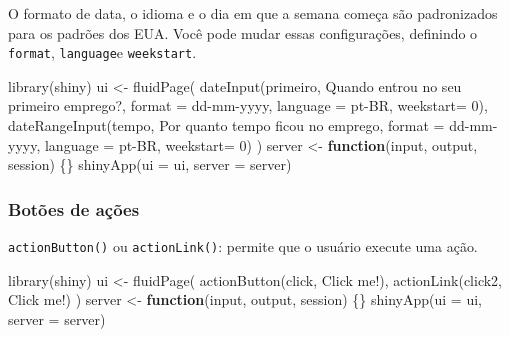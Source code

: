 \documentclass[
]{book}
\newenvironment{Shaded}{\begin{snugshade}}{\end{snugshade}}
\newcommand{\AttributeTok}[1]{\textcolor[rgb]{0.77,0.63,0.00}{#1}}
\newcommand{\ControlFlowTok}[1]{\textcolor[rgb]{0.13,0.29,0.53}{\textbf{#1}}}
\newcommand{\DecValTok}[1]{\textcolor[rgb]{0.00,0.00,0.81}{#1}}
\newcommand{\FunctionTok}[1]{\textcolor[rgb]{0.00,0.00,0.00}{#1}}
\newcommand{\NormalTok}[1]{#1}
\newcommand{\OtherTok}[1]{\textcolor[rgb]{0.56,0.35,0.01}{#1}}
\newcommand{\StringTok}[1]{\textcolor[rgb]{0.31,0.60,0.02}{#1}}
\begin{document}
O formato de data, o idioma e o dia em que a semana começa são padronizados para os padrões dos EUA.
Você pode mudar essas configurações, definindo o \texttt{format}, \texttt{language}e \texttt{weekstart}.

\begin{Shaded}
\begin{Highlighting}[]
\FunctionTok{library}\NormalTok{(shiny)}
\NormalTok{ui }\OtherTok{\textless{}{-}} \FunctionTok{fluidPage}\NormalTok{(}
  \FunctionTok{dateInput}\NormalTok{(}\StringTok{\textquotesingle{}primeiro\textquotesingle{}}\NormalTok{, }\StringTok{\textquotesingle{}Quando entrou no seu primeiro emprego?\textquotesingle{}}\NormalTok{, }\AttributeTok{format =} \StringTok{\textquotesingle{}dd{-}mm{-}yyyy\textquotesingle{}}\NormalTok{, }\AttributeTok{language =} \StringTok{\textquotesingle{}pt{-}BR\textquotesingle{}}\NormalTok{, }\AttributeTok{weekstart=} \DecValTok{0}\NormalTok{),}
  \FunctionTok{dateRangeInput}\NormalTok{(}\StringTok{\textquotesingle{}tempo\textquotesingle{}}\NormalTok{, }\StringTok{\textquotesingle{}Por quanto tempo ficou no emprego\textquotesingle{}}\NormalTok{, }\AttributeTok{format =} \StringTok{\textquotesingle{}dd{-}mm{-}yyyy\textquotesingle{}}\NormalTok{, }\AttributeTok{language =} \StringTok{\textquotesingle{}pt{-}BR\textquotesingle{}}\NormalTok{, }\AttributeTok{weekstart=} \DecValTok{0}\NormalTok{)}
\NormalTok{)}
\NormalTok{server }\OtherTok{\textless{}{-}} \ControlFlowTok{function}\NormalTok{(input, output, session) \{\}}
\FunctionTok{shinyApp}\NormalTok{(}\AttributeTok{ui =}\NormalTok{ ui, }\AttributeTok{server =}\NormalTok{ server)}
\end{Highlighting}
\end{Shaded}

\hypertarget{botuxf5es-de-auxe7uxf5es}{%
\subsubsection{\texorpdfstring{\textbf{Botões de ações}}{Botões de ações}}\label{botuxf5es-de-auxe7uxf5es}}

\texttt{actionButton()} ou \texttt{actionLink()}: permite que o usuário execute uma ação.

\begin{Shaded}
\begin{Highlighting}[]
\FunctionTok{library}\NormalTok{(shiny)}
\NormalTok{ui }\OtherTok{\textless{}{-}} \FunctionTok{fluidPage}\NormalTok{(}
  \FunctionTok{actionButton}\NormalTok{(}\StringTok{\textquotesingle{}click\textquotesingle{}}\NormalTok{, }\StringTok{\textquotesingle{}Click me!\textquotesingle{}}\NormalTok{),}
  \FunctionTok{actionLink}\NormalTok{(}\StringTok{\textquotesingle{}click2\textquotesingle{}}\NormalTok{, }\StringTok{\textquotesingle{}Click me!\textquotesingle{}}\NormalTok{)}
\NormalTok{)}
\NormalTok{server }\OtherTok{\textless{}{-}} \ControlFlowTok{function}\NormalTok{(input, output, session) \{\}}
\FunctionTok{shinyApp}\NormalTok{(}\AttributeTok{ui =}\NormalTok{ ui, }\AttributeTok{server =}\NormalTok{ server)}
\end{Highlighting}
\end{Shaded}
\end{document}
